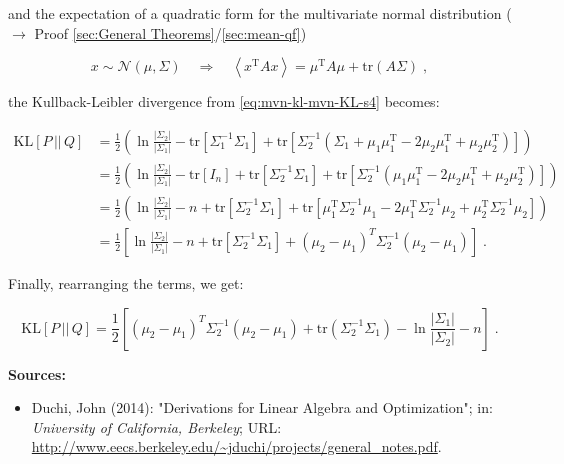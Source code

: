\documentclass[a4paper,12pt,twoside]{book}
\begin{document}
and the expectation of a quadratic form for the multivariate normal distribution ($\rightarrow$ Proof \ref{sec:General Theorems}/\ref{sec:mean-qf})

\begin{equation} \label{eq:mvn-kl-mvn-qfmean}
x \sim \mathcal{N}(\mu, \Sigma) \quad \Rightarrow \quad \left\langle x^\mathrm{T} A x \right\rangle = \mu^\mathrm{T} A \mu + \mathrm{tr}(A \Sigma) \; ,
\end{equation}

the Kullback-Leibler divergence from \eqref{eq:mvn-kl-mvn-KL-s4} becomes:

\begin{equation} \label{eq:mvn-kl-mvn-KL-s5}
\begin{split}
\mathrm{KL}[P\,||\,Q] &= \frac{1}{2} \left( \ln \frac{|\Sigma_2|}{|\Sigma_1|} - \mathrm{tr}\left[ \Sigma_1^{-1} \Sigma_1 \right] + \mathrm{tr}\left[ \Sigma_2^{-1} \left( \Sigma_1 + \mu_1 \mu_1^\mathrm{T} - 2 \mu_2 \mu_1^\mathrm{T} + \mu_2 \mu_2^\mathrm{T} \right) \right] \right) \\
&= \frac{1}{2} \left( \ln \frac{|\Sigma_2|}{|\Sigma_1|} - \mathrm{tr}\left[ I_n \right] + \mathrm{tr}\left[ \Sigma_2^{-1} \Sigma_1 \right] + \mathrm{tr}\left[ \Sigma_2^{-1} \left( \mu_1 \mu_1^\mathrm{T} - 2 \mu_2 \mu_1^\mathrm{T} + \mu_2 \mu_2^\mathrm{T} \right) \right] \right) \\
&= \frac{1}{2} \left( \ln \frac{|\Sigma_2|}{|\Sigma_1|} - n + \mathrm{tr}\left[ \Sigma_2^{-1} \Sigma_1 \right] + \mathrm{tr}\left[ \mu_1^\mathrm{T} \Sigma_2^{-1} \mu_1  - 2 \mu_1^\mathrm{T} \Sigma_2^{-1} \mu_2  + \mu_2^\mathrm{T} \Sigma_2^{-1} \mu_2 \right] \right) \\
&= \frac{1}{2} \left[ \ln \frac{|\Sigma_2|}{|\Sigma_1|} - n + \mathrm{tr}\left[ \Sigma_2^{-1} \Sigma_1 \right] + (\mu_2 - \mu_1)^T \Sigma_2^{-1} (\mu_2 - \mu_1) \right] \; .
\end{split}
\end{equation}

Finally, rearranging the terms, we get:

\begin{equation} \label{eq:mvn-kl-mvn-KL-qed}
\mathrm{KL}[P\,||\,Q] = \frac{1}{2} \left[ (\mu_2 - \mu_1)^T \Sigma_2^{-1} (\mu_2 - \mu_1) + \mathrm{tr}(\Sigma_2^{-1} \Sigma_1) - \ln \frac{|\Sigma_1|}{|\Sigma_2|} - n \right] \; .
\end{equation}


\vspace{1em}
\textbf{Sources:}
\begin{itemize}
\item Duchi, John (2014): "Derivations for Linear Algebra and Optimization"; in: \textit{University of California, Berkeley}; URL: \url{http://www.eecs.berkeley.edu/~jduchi/projects/general_notes.pdf}.
\end{itemize}
\end{document}

